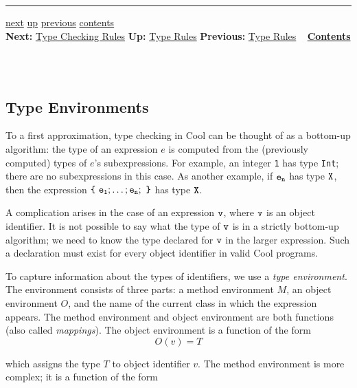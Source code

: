 \documentclass[]{article}
\begin{document}
\begin{center}\rule{3in}{0.4pt}\end{center}

\href{node43.html}{next} \href{node41.html}{up}
\href{node41.html}{previous} \href{node1.html}{contents} \\
\textbf{Next:} \href{node43.html}{Type Checking Rules} \textbf{Up:}
\href{node41.html}{Type Rules} \textbf{Previous:}
\href{node41.html}{Type Rules} ~ \textbf{\href{node1.html}{Contents}} \\
\\

\subsection{\\ Type Environments}

To a first approximation, type checking in Cool can be thought of as a
bottom-up algorithm: the type of an expression $e$ is computed from the
(previously computed) types of $e$'s subexpressions. For example, an
integer \texttt{1} has type \texttt{Int}; there are no subexpressions in
this case. As another example, if $\tt e_n$ has type $\tt X$, then the
expression $\tt\mbox {\tt\{}\ e_1; \ldots; e_n;\ \mbox {\tt\}}$ has type
$\tt X$.

A complication arises in the case of an expression $\tt v$, where
$\tt v$ is an object identifier. It is not possible to say what the type
of $\tt v$ is in a strictly bottom-up algorithm; we need to know the
type declared for $\tt v$ in the larger expression. Such a declaration
must exist for every object identifier in valid Cool programs.

To capture information about the types of identifiers, we use a
\emph{type environment}. The environment consists of three parts: a
method environment $M$, an object environment $O$, and the name of the
current class in which the expression appears. The method environment
and object environment are both functions (also called \emph{mappings}).
The object environment is a function of the form \\

\begin{displaymath}O(v) = T \end{displaymath}

which assigns the type $ T$ to object identifier $ v$. The method
environment is more complex; it is a function of the form \\
\end{document}
